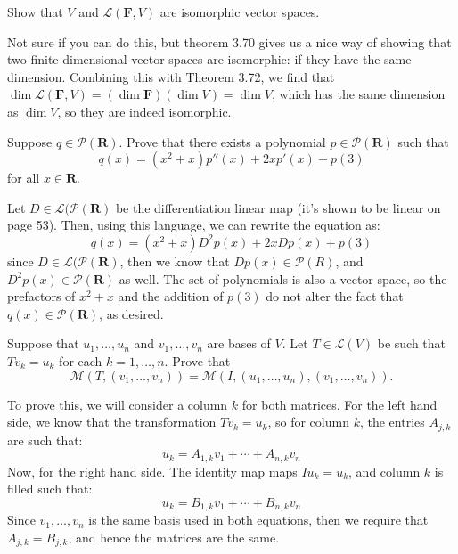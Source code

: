 \documentclass[10pt]{article}
\renewcommand{\R}{\mathbf R}
\newcommand{\F}{\mathbf F}
\begin{document}
	\begin{problem}
		Show that \( V \) and \( \mathcal L(\F, V) \) are isomorphic vector spaces. 
	\end{problem}

	\begin{solution}
		Not sure if you can do this, but theorem 3.70 gives us a nice way of showing that two finite-dimensional 
		vector spaces are isomorphic: if they have the same dimension. Combining this with Theorem 3.72, we 
		find that \( \dim \mathcal L(\F, V) = (\dim \F) (\dim V) = \dim V\), which has the same dimension as 
		\( \dim V \), so they are indeed isomorphic. 

	\end{solution}

	\begin{problem}
		Suppose \( q \in \mathcal P(\R) \). Prove that there exists a polynomial \( p \in \mathcal P(\R) \) such 
		that 
		\[
		q(x) = (x^2 + x)p''(x) + 2xp'(x) + p(3)
		\] 
		for all \( x\in \R \). 
	\end{problem}

	\begin{solution}
		Let \( D \in \mathcal L(\mathcal P(\R) \) be the differentiation linear map (it's shown to be 
		linear on page 53). Then, using this language, 
		we can rewrite the equation as:
		\[
		q(x) = (x^2 + x) D^2 p(x) + 2xDp(x) + p(3)
		\] 
		since \( D \in \mathcal L(\mathcal P(\R) \), then we know that \( Dp(x) \in \mathcal P(R) \), and 
		\( D^2 p(x) \in \mathcal P(\R) \) as well. The set of polynomials is also a vector space, so 
		the prefactors of \( x^2 + x \) and the addition of  \( p(3) \) do not alter the fact that 
		\( q(x) \in \mathcal P(\R) \), as desired. 
	\end{solution}

	\begin{problem}
		Suppose that \( u_1, \dots, u_n \) and \( v_1, \dots, v_n \) are bases of \( V \). Let 
		\( T \in \mathcal L(V)  \) be such that \( Tv_k = u_k \) for each \( k = 1,\dots, n \). Prove that 
		\[
		\mathcal M(T, (v_1, \dots, v_n)) = \mathcal M(I, (u_1, \dots, u_n), (v_1, \dots, v_n)). 
		\] 
	\end{problem}

	\begin{solution}
		To prove this, we will consider a column \( k \) for both matrices. For the left hand side, we know that 
		the transformation \( Tv_k = u_k \), so for column \( k \), the entries \( A_{j, k} \) are such that:
		\[
		u_k = A_{1, k}v_1 + \cdots + A_{n, k}v_n
		\] 
		Now, for the right hand side. The identity map maps  \( Iu_k = u_k \), and column \( k \) is filled such 
		that:
		\[
		u_k = B_{1, k}v_1 + \cdots + B_{n, k}v_n
		\] 
		Since \( v_1, \dots, v_n \) is the same basis used in both equations, then we require that \( A_{j, k} = 
		B_{j, k}\), and hence the matrices are the same. 
	\end{solution}
\end{document}
